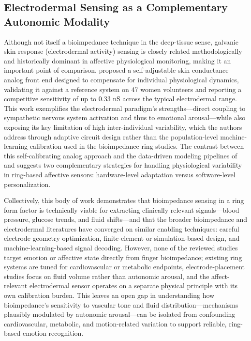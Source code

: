 \subsection{Electrodermal Sensing as a Complementary Autonomic Modality}
Although not itself a bioimpedance technique in the deep-tissue sense, galvanic skin response (electrodermal activity) sensing is closely related methodologically and historically dominant in affective physiological monitoring, making it an important point of comparison. \cite{miranda2023self} proposed a self-adjustable skin conductance analog front end designed to compensate for individual physiological dynamics, validating it against a reference system on 47 women volunteers and reporting a competitive sensitivity of up to 0.33 nS across the typical electrodermal range. This work exemplifies the electrodermal paradigm's strengths---direct coupling to sympathetic nervous system activation and thus to emotional arousal---while also exposing its key limitation of high inter-individual variability, which the authors address through adaptive circuit design rather than the population-level machine-learning calibration used in the bioimpedance-ring studies. The contrast between this self-calibrating analog approach and the data-driven modeling pipelines of \cite{sel2023continuous} and \cite{sanai2021evaluation} suggests two complementary strategies for handling physiological variability in ring-based affective sensors: hardware-level adaptation versus software-level personalization.

Collectively, this body of work demonstrates that bioimpedance sensing in a ring form factor is technically viable for extracting clinically relevant signals---blood pressure, glucose trends, and fluid shifts---and that the broader bioimpedance and electrodermal literatures have converged on similar enabling techniques: careful electrode geometry optimization, finite-element or simulation-based design, and machine-learning-based signal decoding. However, none of the reviewed studies target emotion or affective state directly from finger bioimpedance; existing ring systems are tuned for cardiovascular or metabolic endpoints, electrode-placement studies focus on fluid volume rather than autonomic arousal, and the affect-relevant electrodermal sensor operates on a separate physical principle with its own calibration burden. This leaves an open gap in understanding how bioimpedance's sensitivity to vascular tone and fluid distribution---mechanisms plausibly modulated by autonomic arousal---can be isolated from confounding cardiovascular, metabolic, and motion-related variation to support reliable, ring-based emotion recognition.

